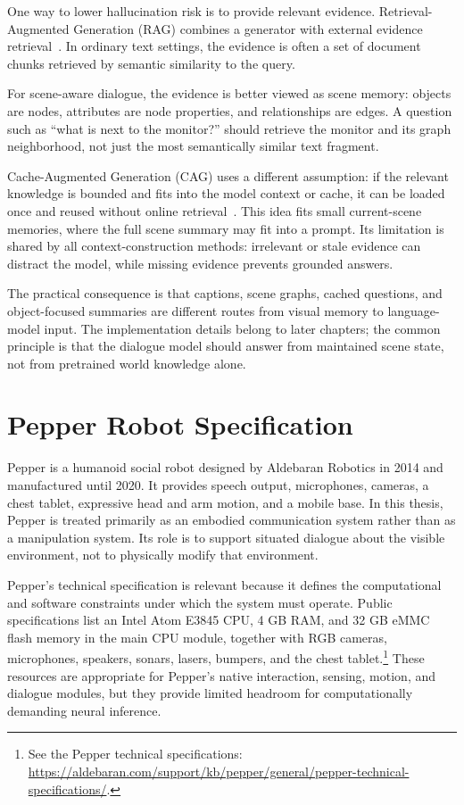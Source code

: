 One way to lower hallucination risk is to provide relevant evidence. Retrieval-Augmented Generation (RAG) combines a generator with external evidence retrieval~\cite{lewis_retrieval-augmented_2020}. In ordinary text settings, the evidence is often a set of document chunks retrieved by semantic similarity to the query.

For scene-aware dialogue, the evidence is better viewed as scene memory: objects are nodes, attributes are node properties, and relationships are edges. A question such as \enquote{what is next to the monitor?} should retrieve the monitor and its graph neighborhood, not just the most semantically similar text fragment.

Cache-Augmented Generation (CAG) uses a different assumption: if the relevant knowledge is bounded and fits into the model context or cache, it can be loaded once and reused without online retrieval~\cite{Chan_2025}. This idea fits small current-scene memories, where the full scene summary may fit into a prompt. Its limitation is shared by all context-construction methods: irrelevant or stale evidence can distract the model, while missing evidence prevents grounded answers.

The practical consequence is that captions, scene graphs, cached questions, and object-focused summaries are different routes from visual memory to language-model input. The implementation details belong to later chapters; the common principle is that the dialogue model should answer from maintained scene state, not from pretrained world knowledge alone.

\section{Pepper Robot Specification}\label{sec:pepper-specification}

Pepper is a humanoid social robot designed by Aldebaran Robotics in 2014 and manufactured until 2020. It provides speech output, microphones, cameras, a chest tablet, expressive head and arm motion, and a mobile base. In this thesis, Pepper is treated primarily as an embodied communication system rather than as a manipulation system. Its role is to support situated dialogue about the visible environment, not to physically modify that environment.

Pepper's technical specification is relevant because it defines the computational and software constraints under which the system must operate. Public specifications list an Intel Atom E3845 CPU, 4 GB RAM, and 32 GB eMMC flash memory in the main CPU module, together with RGB cameras, microphones, speakers, sonars, lasers, bumpers, and the chest tablet.\footnote{See the Pepper technical specifications: \url{https://aldebaran.com/support/kb/pepper/general/pepper-technical-specifications/}.} These resources are appropriate for Pepper's native interaction, sensing, motion, and dialogue modules, but they provide limited headroom for computationally demanding neural inference.

